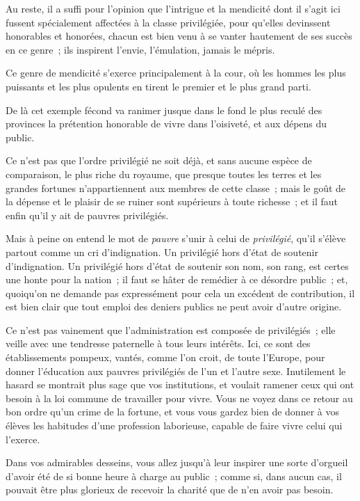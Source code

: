 \documentclass[french,twoside]{book} %
\begin{document}
Au reste, il a suffi pour l’opinion que l’intrigue et la mendicité dont il s’agit ici fussent spécialement affectées à la classe privilégiée, pour qu’elles devinssent honorables et honorées, chacun est bien venu à se vanter hautement de ses succès en ce genre ; ils inspirent l’envie, l’émulation, jamais le mépris.\par
Ce genre de mendicité s’exerce principalement à la cour, où les hommes les plus puissants et les plus opulents en tirent le premier et le plus grand parti.\par
De là cet exemple fécond va ranimer jusque dans le fond le plus reculé des provinces la prétention honorable de vivre dans l’oisiveté, et aux dépens du public.\par
Ce n’est pas que l’ordre privilégié ne soit déjà, et sans aucune espèce de comparaison, le plus riche du royaume, que presque toutes les terres et les grandes fortunes n’appartiennent aux membres de cette classe ; mais le goût de la dépense et le plaisir de se ruiner sont supérieurs à toute richesse ; et il faut enfin qu’il y ait de pauvres privilégiés.\par
Mais à peine on entend le mot de {\itshape pauvre} s’unir à celui de {\itshape privilégié}, qu’il s’élève partout comme un cri d’indignation. Un privilégié hors d’état de soutenir d’indignation. Un privilégié hors d’état de soutenir son nom, son rang, est certes une honte pour la nation ; il faut se hâter de remédier à ce désordre public ; et, quoiqu’on ne demande pas expressément pour cela un excédent de contribution, il est bien clair que tout emploi des deniers publics ne peut avoir d’autre origine.\par
Ce n’est pas vainement que l’administration est composée de privilégiés ; elle veille avec une tendresse paternelle à tous leurs intérêts. Ici, ce sont des établissements pompeux, vantés, comme l’on croit, de toute l’Europe, pour donner l’éducation aux pauvres privilégiés de l’un et l’autre sexe. Inutilement le hasard se montrait plus sage que vos institutions, et voulait ramener ceux qui ont besoin à la loi commune de travailler pour vivre. Vous ne voyez dans ce retour au bon ordre qu’un crime de la fortune, et vous vous gardez bien de donner à vos élèves les habitudes d’une profession laborieuse, capable de faire vivre celui qui l’exerce.\par
Dans vos admirables desseins, vous allez jusqu’à leur inspirer une sorte d’orgueil d’avoir été de si bonne heure à charge au public ; comme si, dans aucun cas, il pouvait être plus glorieux de recevoir la charité que de n’en avoir pas besoin.\par
\end{document}
